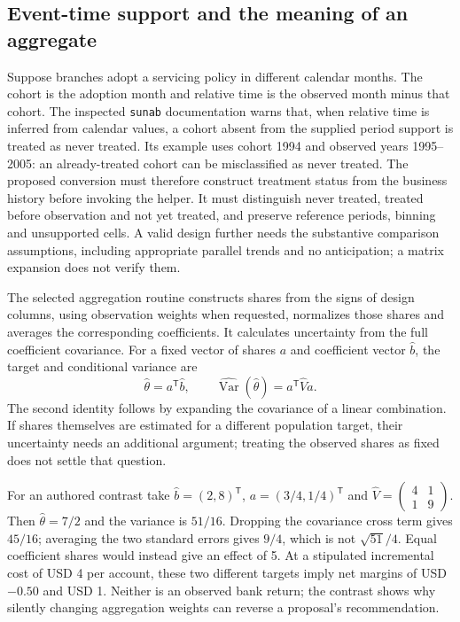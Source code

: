 \subsection{Event-time support and the meaning of an aggregate}
\label{exec20:fx-eventtime}
Suppose branches adopt a servicing policy in different calendar months.
The cohort is the adoption month and relative time is the observed month
minus that cohort. The inspected \texttt{sunab} documentation warns that,
when relative time is inferred from calendar values, a cohort absent from
the supplied period support is treated as never treated. Its example uses
cohort 1994 and observed years 1995--2005: an already-treated cohort can be
misclassified as never treated. The proposed conversion must therefore
construct treatment status from the business history before invoking the
helper. It must distinguish never treated, treated before observation and
not yet treated, and preserve reference periods, binning and unsupported
cells. A valid design further needs the substantive comparison assumptions,
including appropriate parallel trends and no anticipation; a matrix expansion
does not verify them.\citep{exec20_fixest_source}

The selected aggregation routine constructs shares from the signs of design
columns, using observation weights when requested, normalizes those shares
and averages the corresponding coefficients. It calculates uncertainty from
the full coefficient covariance. For a fixed vector of shares $a$ and
coefficient vector $\widehat b$, the target and conditional variance are
\begin{equation}
 \widehat\theta=a^{\mathsf T}\widehat b,\qquad
 \widehat{\operatorname{Var}}(\widehat\theta)=a^{\mathsf T}\widehat V a.
 \label{exec20:fx-aggregate}
\end{equation}
The second identity follows by expanding the covariance of a linear
combination. If shares themselves are estimated for a different population
target, their uncertainty needs an additional argument; treating the observed
shares as fixed does not settle that question.\citep{exec20_fixest_source}

For an authored contrast take $\widehat b=(2,8)^{\mathsf T}$,
$a=(3/4,1/4)^{\mathsf T}$ and
$\widehat V=\left(\begin{smallmatrix}4&1\\1&9\end{smallmatrix}\right)$.
Then $\widehat\theta=7/2$ and the variance is $51/16$. Dropping the covariance
cross term gives $45/16$; averaging the two standard errors gives $9/4$,
which is not $\sqrt{51}/4$. Equal coefficient shares would instead give an
effect of 5. At a stipulated incremental cost of USD 4 per account, these two
different targets imply net margins of USD $-0.50$ and USD 1. Neither is an
observed bank return; the contrast shows why silently changing aggregation
weights can reverse a proposal's recommendation.\citep{exec20_fixest_reference}

